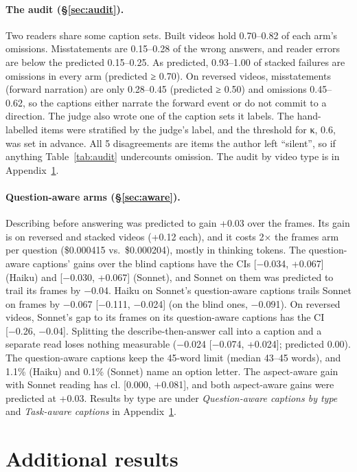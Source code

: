\documentclass[11pt]{article}
\newcommand{\cl}{cl.}
\begin{document}
\paragraph{The audit (\S\ref{sec:audit}).} Two readers share some caption sets. Built videos hold 0.70--0.82 of each arm's omissions. Misstatements are 0.15--0.28 of the wrong answers, and reader errors are below the predicted 0.15--0.25. As predicted, 0.93--1.00 of stacked failures are omissions in every arm (predicted ≥ 0.70). On reversed videos, misstatements (forward narration) are only 0.28--0.45 (predicted ≥ 0.50) and omissions 0.45--0.62, so the captions either narrate the forward event or do not commit to a direction. The judge also wrote one of the caption sets it labels. The hand-labelled items were stratified by the judge's label, and the threshold for κ, 0.6, was set in advance. All 5 disagreements are items the author left ``silent'', so if anything Table~\ref{tab:audit} undercounts omission. The audit by video type is in Appendix~\ref{app:extra}.

\paragraph{Question-aware arms (\S\ref{sec:aware}).} Describing before answering was predicted to gain +0.03 over the frames. Its gain is on reversed and stacked videos (+0.12 each), and it costs 2× the frames arm per question (\$0.000415 vs.\ \$0.000204), mostly in thinking tokens. The question-aware captions' gains over the blind captions have the CIs [−0.034, +0.067] (Haiku) and [−0.030, +0.067] (Sonnet), and Sonnet on them was predicted to trail its frames by −0.04. Haiku on Sonnet's question-aware captions trails Sonnet on frames by −0.067 [−0.111, −0.024] (on the blind ones, −0.091). On reversed videos, Sonnet's gap to its frames on its question-aware captions has the CI [−0.26, −0.04]. Splitting the describe-then-answer call into a caption and a separate read loses nothing measurable (−0.024 [−0.074, +0.024]; predicted 0.00). The question-aware captions keep the 45-word limit (median 43--45 words), and 1.1\% (Haiku) and 0.1\% (Sonnet) name an option letter. The aspect-aware gain with Sonnet reading has \cl{} [0.000, +0.081], and both aspect-aware gains were predicted at +0.03. Results by type are under \emph{Question-aware captions by type} and \emph{Task-aware captions} in Appendix~\ref{app:extra}.

\section{Additional results}
\label{app:extra}
\end{document}
